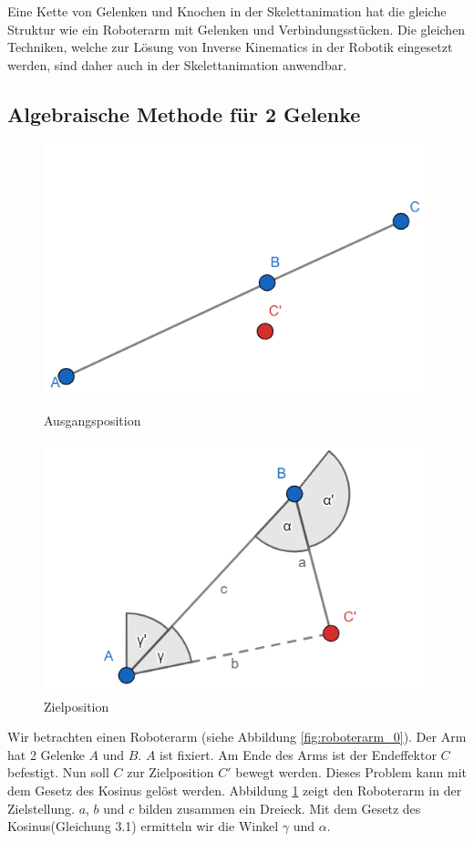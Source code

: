 Eine Kette von Gelenken und Knochen in der Skelettanimation hat die gleiche Struktur wie ein Roboterarm mit Gelenken und Verbindungsstücken. Die gleichen Techniken, welche zur Lösung von Inverse Kinematics in der Robotik eingesetzt werden, sind daher auch in der Skelettanimation anwendbar.
%
\subsection{Algebraische Methode für 2 Gelenke}
\begin{figure}[!htb]
	\includegraphics[width=\linewidth]{img/roboterarm_0.png}
	\caption{Ausgangsposition}\label{fig:roboterarm_0}
	\endminipage\hfill
	\includegraphics[width=\linewidth]{img/roboterarm_1.png}
	\caption{Zielposition}\label{fig:roboterarm_1}
	\endminipage\hfill
\end{figure}
Wir betrachten einen Roboterarm (siehe Abbildung \ref{fig:roboterarm_0}). Der Arm hat 2 Gelenke $A$ und $B$. $A$ ist fixiert. Am Ende des Arms ist der Endeffektor $C$ befestigt. Nun soll $C$ zur Zielposition $C'$ bewegt werden. Dieses Problem kann mit dem Gesetz des Kosinus gelöst werden. Abbildung \ref{fig:roboterarm_1} zeigt den Roboterarm in der Zielstellung. $a$, $b$ und $c$ bilden zusammen ein Dreieck. Mit dem Gesetz des Kosinus(Gleichung 3.1) ermitteln wir die Winkel $\gamma$ und $\alpha$.\\
